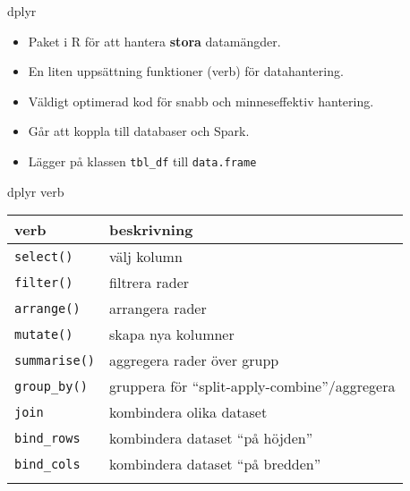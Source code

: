 \documentclass[
  10pt,
  ignorenonframetext,
  handout]{beamer}
\providecommand{\tightlist}{%
  \setlength{\itemsep}{0pt}\setlength{\parskip}{0pt}}
\begin{document}
\begin{frame}[fragile]{dplyr}
\label{dplyr}
\begin{itemize}
\tightlist
\item
  Paket i R för att hantera \textbf{stora} datamängder.
\item
  En liten uppsättning funktioner (verb) för datahantering.
\item
  Väldigt optimerad kod för snabb och minneseffektiv hantering.
\item
  Går att koppla till databaser och Spark.
\item
  Lägger på klassen \texttt{tbl\_df} till \texttt{data.frame}
\end{itemize}
\end{frame}

\begin{frame}[fragile]{dplyr verb}
\label{dplyr-verb}
\begin{longtable}[]{@{}ll@{}}
\toprule\noalign{}
verb & beskrivning \\
\midrule\noalign{}
\endhead
\texttt{select()} & välj kolumn \\
\texttt{filter()} & filtrera rader \\
\texttt{arrange()} & arrangera rader \\
\texttt{mutate()} & skapa nya kolumner \\
\texttt{summarise()} & aggregera rader över grupp \\
\texttt{group\_by()} & gruppera för ``split-apply-combine''/aggregera \\
\texttt{join} & kombindera olika dataset \\
\texttt{bind\_rows} & kombindera dataset ``på höjden'' \\
\texttt{bind\_cols} & kombindera dataset ``på bredden'' \\
\bottomrule\noalign{}
\end{longtable}
\end{frame}
\end{document}

